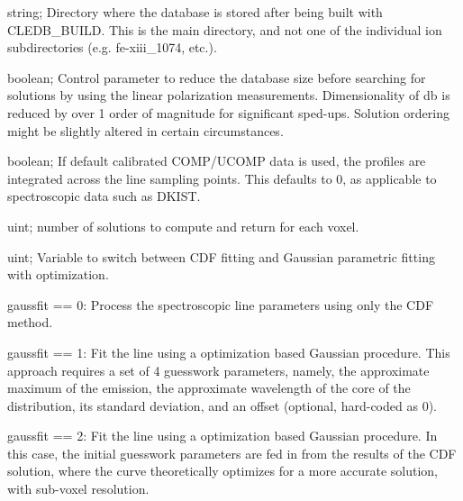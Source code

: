 \documentclass{article}
\begin{document}
\begin{description}
    [font=\normalfont,leftmargin=1.3in,style=multiline]
	\item[dbdir]
	string; Directory where the database is stored after being built with CLEDB\_BUILD. This is the main directory, and not one of the individual ion subdirectories (e.g. fe-xiii\_1074, etc.).
	\item[reduced]
	boolean; Control parameter to reduce the database size before searching for solutions by using the linear polarization measurements. Dimensionality of db is reduced by over 1 order of magnitude for significant sped-ups. Solution ordering might be slightly altered in certain circumstances.
	\item[integrated]
	boolean; If default calibrated COMP/UCOMP data is used, the profiles are integrated across the line sampling points. This defaults to 0, as applicable to spectroscopic data such as DKIST. 
	\item[nsearch]
	uint; number of solutions to compute and return for each voxel. 
	\item[gaussfit]
	uint; Variable to switch between CDF fitting and Gaussian parametric fitting with optimization.
	\item[]
	gaussfit == 0: Process the spectroscopic line parameters using only the CDF method.
	\item[]
	gaussfit == 1: Fit the line using a optimization based Gaussian procedure. This approach requires a set of 4 guesswork parameters, namely, the approximate maximum of the emission, the approximate wavelength of the core of the distribution, its standard deviation, and an offset (optional, hard-coded as 0).
	\item[]
	gaussfit == 2: Fit the line using a optimization based Gaussian procedure. In this case, the initial guesswork parameters are fed in from the results of the CDF solution, where the curve theoretically optimizes for a more accurate solution, with sub-voxel resolution.	
	

\end{description}
\end{document}
